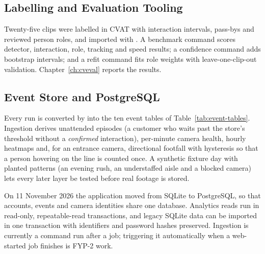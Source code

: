 \subsection{Labelling and Evaluation Tooling}
Twenty-five clips were labelled in CVAT with interaction intervals, pass-bys and reviewed person roles, and imported with . A benchmark command scores detector, interaction, role, tracking and speed results; a confidence command adds bootstrap intervals; and a refit command fits role weights with leave-one-clip-out validation. Chapter~\ref{ch:cveval} reports the results.

\subsection{Event Store and PostgreSQL}
Every run is converted by  into the ten event tables of Table~\ref{tab:event-tables}. Ingestion derives unattended episodes (a customer who waits past the store's threshold without a \emph{confirmed} interaction), per-minute camera health, hourly heatmaps and, for an entrance camera, directional footfall with hysteresis so that a person hovering on the line is counted once. A synthetic fixture day\label{sec:fixture} with planted patterns (an evening rush, an understaffed aisle and a blocked camera) lets every later layer be tested before real footage is stored.

On 11 November 2026 the application moved from SQLite to PostgreSQL, so that accounts, events and camera identities share one database. Analytics reads run in read-only, repeatable-read transactions, and legacy SQLite data can be imported in one transaction with identifiers and password hashes preserved. Ingestion is currently a command run after a job; triggering it automatically when a web-started job finishes is FYP-2 work.

